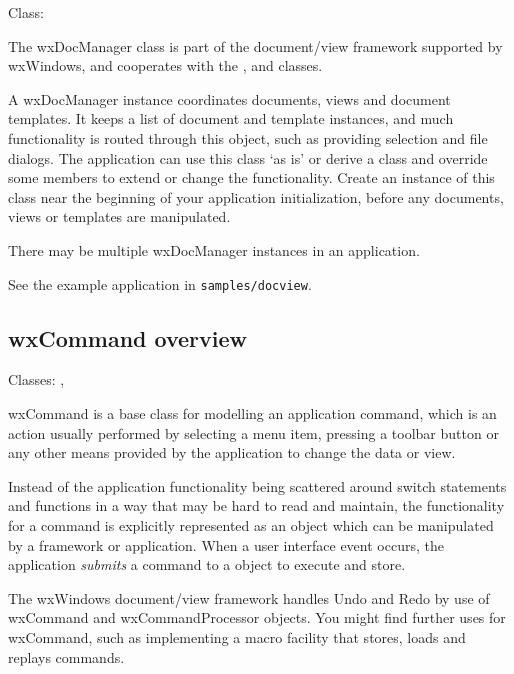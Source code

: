 Class: 

The wxDocManager class is part of the document/view framework supported by wxWindows,
and cooperates with the , \rtfsp
and  classes.

A wxDocManager instance coordinates documents, views and document templates. It keeps a list of document 
and template instances, and much functionality is routed through this object, such
as providing selection and file dialogs. The application can use this class `as is' or
derive a class and override some members to extend or change the functionality.
Create an instance of this class near the beginning of your application initialization,
before any documents, views or templates are manipulated.

There may be multiple wxDocManager instances in an application.

See the example application in {\tt samples/docview}.

\subsection{wxCommand overview}\label{wxcommandoverview}


Classes: , 

wxCommand is a base class for modelling an application command,
which is an action usually performed by selecting a menu item, pressing
a toolbar button or any other means provided by the application to
change the data or view.

Instead of the application functionality being scattered around
switch statements and functions in a way that may be hard to
read and maintain, the functionality for a command is explicitly represented
as an object which can be manipulated by a framework or application.
When a user interface event occurs, the application {\it submits} a command
to a  object to execute and
store.

The wxWindows document/view framework handles Undo and Redo by use of
wxCommand and wxCommandProcessor objects. You might find further uses
for wxCommand, such as implementing a macro facility that stores, loads
and replays commands.

